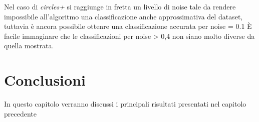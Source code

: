 \documentclass[12pt,a4paper]{report}
\begin{document}
Nel caso di \textit{circles+} si raggiunge in fretta un livello di noise tale da rendere impossibile all'algoritmo una classificazione anche approssimativa del dataset, tuttavia è ancora possibile ottenre una classificazione accurata per noise = 0.1
È facile immaginare che le classificazioni per noise > 0,4 non siano molto diverse da quella mostrata.

\chapter{Conclusioni}

In questo capitolo verranno discussi i principali risultati presentati nel capitolo precedente

\listoffigures

\nocite{*}


\end{document}
